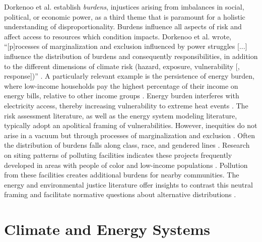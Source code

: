 Dorkenoo et al. \cite{dorkenoo_critical_2022} establish \textit{burdens},
injustices arising from imbalances in social, political, or economic power, as a
third theme that is paramount for a holistic understanding of
disproportionality. Burdens influence all aspects of risk and affect access to
resources which condition impacts. Dorkenoo et al. wrote, ``[p]rocesses of
marginalization and exclusion influenced by power struggles [...] influence the
distribution of burdens and consequently responsibilities, in addition to the
different dimensions of climate risk (hazard, exposure, vulnerability [,
response])'' \cite{dorkenoo_critical_2022}. A particularly relevant example is
the persistence of energy burden, where low-income households pay the highest
percentage of their income on energy bills, relative to other income groups
\cite{brown_high_2020, cong_unveiling_2022}. Energy burden interferes with
electricity access, thereby increasing vulnerability to extreme heat events
\cite{cong_unveiling_2022, klinenberg_heat_2003}. The risk assessment
literature, as well as the energy system modeling literature, typically adopt an
apolitical framing of vulnerabilities. However, inequities do not arise in a
vacuum but through processes of marginalization and exclusion
\cite{thomas_explaining_2019}. Often the distribution of burdens falls along
class, race, and gendered lines \cite{thomas_explaining_2019,mohai_which_2015}.
Research on siting patterns of polluting facilities indicates these projects
frequently developed in areas with people of color and low-income populations
\cite{mohai_which_2015}. Pollution from these facilities creates additional
burdens for nearby communities. The energy and environmental justice literature
offer insights to contrast this neutral framing and facilitate normative
questions about alternative distributions \cite{dorkenoo_critical_2022,
thomas_explaining_2019}.

\noindent\hrulefill

\section{Climate and Energy Systems}

